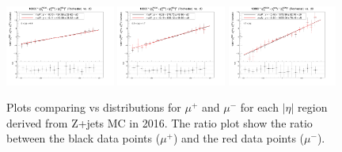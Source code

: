 \begin{figure}[h!]
    \centering
    \includegraphics[width=0.32\textwidth]{images_geofit/muCharge_eta_0_0p9_2016.png}
    \includegraphics[width=0.32\textwidth]{images_geofit/muCharge_eta_0p9_1p7_2016.png}
    \includegraphics[width=0.32\textwidth]{images_geofit/muCharge_eta_1p7_inf_2016.png}
    \caption{Plots comparing \dptoverptsquare vs \dzeroBS distributions for $\mu^+$ and $\mu^-$ for each $|\eta|$ region derived from Z+jets MC in 2016. The ratio plot show the ratio between the black data points ($\mu^+$) and the red data points ($\mu^-$).}
    \label{fig:muCharge_d0_2016}
\end{figure}

